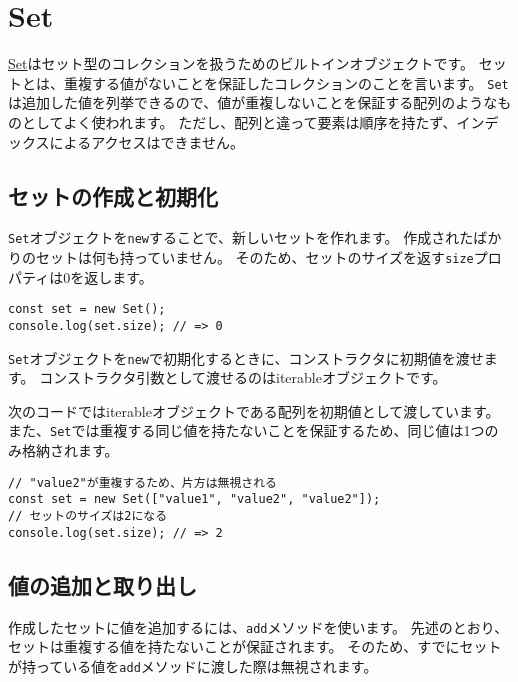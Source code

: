 \hypertarget{set}{%
\section{Set}\label{set}}

\href{https://developer.mozilla.org/ja/docs/Web/JavaScript/Reference/Global_Objects/Set}{Set}はセット型のコレクションを扱うためのビルトインオブジェクトです。
セットとは、重複する値がないことを保証したコレクションのことを言います。
\texttt{Set}は追加した値を列挙できるので、値が重複しないことを保証する配列のようなものとしてよく使われます。
ただし、配列と違って要素は順序を持たず、インデックスによるアクセスはできません。

\hypertarget{set-new}{%
\subsection{セットの作成と初期化}\label{set-new}}

\texttt{Set}オブジェクトを\texttt{new}することで、新しいセットを作れます。
作成されたばかりのセットは何も持っていません。
そのため、セットのサイズを返す\texttt{size}プロパティは0を返します。

\begin{lstlisting}
const set = new Set();
console.log(set.size); // => 0
\end{lstlisting}

\texttt{Set}オブジェクトを\texttt{new}で初期化するときに、コンストラクタに初期値を渡せます。
コンストラクタ引数として渡せるのはiterableオブジェクトです。

次のコードではiterableオブジェクトである配列を初期値として渡しています。
また、\texttt{Set}では重複する同じ値を持たないことを保証するため、同じ値は1つのみ格納されます。

\begin{lstlisting}
// "value2"が重複するため、片方は無視される
const set = new Set(["value1", "value2", "value2"]);
// セットのサイズは2になる
console.log(set.size); // => 2
\end{lstlisting}

\hypertarget{set-read-and-write}{%
\subsection{値の追加と取り出し}\label{set-read-and-write}}

作成したセットに値を追加するには、\texttt{add}メソッドを使います。
先述のとおり、セットは重複する値を持たないことが保証されます。
そのため、すでにセットが持っている値を\texttt{add}メソッドに渡した際は無視されます。


